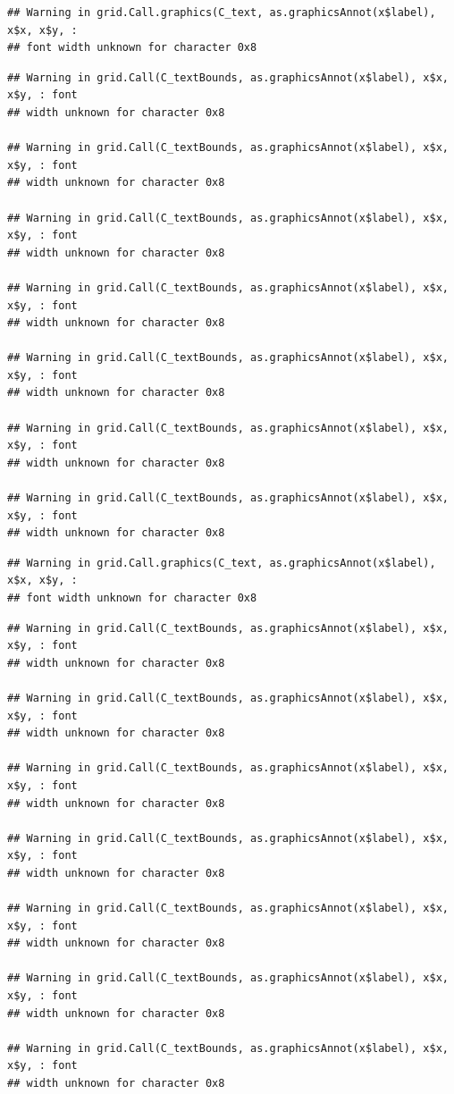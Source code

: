 \documentclass[
]{article}
\begin{document}
\begin{verbatim}
## Warning in grid.Call.graphics(C_text, as.graphicsAnnot(x$label), x$x, x$y, :
## font width unknown for character 0x8
\end{verbatim}

\begin{verbatim}
## Warning in grid.Call(C_textBounds, as.graphicsAnnot(x$label), x$x, x$y, : font
## width unknown for character 0x8

## Warning in grid.Call(C_textBounds, as.graphicsAnnot(x$label), x$x, x$y, : font
## width unknown for character 0x8

## Warning in grid.Call(C_textBounds, as.graphicsAnnot(x$label), x$x, x$y, : font
## width unknown for character 0x8

## Warning in grid.Call(C_textBounds, as.graphicsAnnot(x$label), x$x, x$y, : font
## width unknown for character 0x8

## Warning in grid.Call(C_textBounds, as.graphicsAnnot(x$label), x$x, x$y, : font
## width unknown for character 0x8

## Warning in grid.Call(C_textBounds, as.graphicsAnnot(x$label), x$x, x$y, : font
## width unknown for character 0x8

## Warning in grid.Call(C_textBounds, as.graphicsAnnot(x$label), x$x, x$y, : font
## width unknown for character 0x8
\end{verbatim}

\begin{verbatim}
## Warning in grid.Call.graphics(C_text, as.graphicsAnnot(x$label), x$x, x$y, :
## font width unknown for character 0x8
\end{verbatim}

\begin{verbatim}
## Warning in grid.Call(C_textBounds, as.graphicsAnnot(x$label), x$x, x$y, : font
## width unknown for character 0x8

## Warning in grid.Call(C_textBounds, as.graphicsAnnot(x$label), x$x, x$y, : font
## width unknown for character 0x8

## Warning in grid.Call(C_textBounds, as.graphicsAnnot(x$label), x$x, x$y, : font
## width unknown for character 0x8

## Warning in grid.Call(C_textBounds, as.graphicsAnnot(x$label), x$x, x$y, : font
## width unknown for character 0x8

## Warning in grid.Call(C_textBounds, as.graphicsAnnot(x$label), x$x, x$y, : font
## width unknown for character 0x8

## Warning in grid.Call(C_textBounds, as.graphicsAnnot(x$label), x$x, x$y, : font
## width unknown for character 0x8

## Warning in grid.Call(C_textBounds, as.graphicsAnnot(x$label), x$x, x$y, : font
## width unknown for character 0x8
\end{verbatim}
\end{document}
